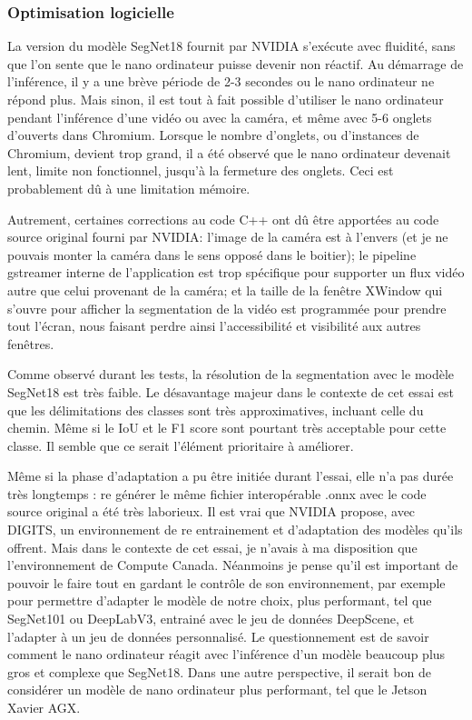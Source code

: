 \subsubsection{Optimisation logicielle}
\par La version du modèle SegNet18 fournit par NVIDIA s'exécute avec fluidité, sans que l'on sente que le nano ordinateur puisse devenir non réactif. Au démarrage de l'inférence, il y a une brève période de 2-3 secondes ou le nano ordinateur ne répond plus. Mais sinon, il est tout à fait possible d'utiliser le nano ordinateur pendant l'inférence d'une vidéo ou avec la caméra, et même avec 5-6 onglets d'ouverts dans Chromium. Lorsque le nombre d'onglets, ou d'instances de Chromium, devient trop grand, il a été observé que le nano ordinateur devenait lent, limite non fonctionnel, jusqu'à la fermeture des onglets. Ceci est probablement dû à une limitation mémoire.
\par Autrement, certaines corrections au code C++ ont dû être apportées au code source original fourni par NVIDIA: l'image de la caméra est à l'envers (et je ne pouvais monter la caméra dans le sens opposé dans le boitier); le pipeline gstreamer interne de l'application est trop spécifique pour supporter un flux vidéo autre que celui provenant de la caméra; et la taille de la fenêtre XWindow qui s'ouvre pour afficher la segmentation de la vidéo est programmée pour prendre tout l'écran, nous faisant perdre ainsi l'accessibilité et visibilité aux autres fenêtres.
\par Comme observé durant les tests, la résolution de la segmentation avec le modèle SegNet18 est très faible. Le désavantage majeur dans le contexte de cet essai est que les délimitations des classes sont très approximatives, incluant celle du chemin. Même si le IoU et le F1 score sont pourtant très acceptable pour cette classe. Il semble que ce serait l'élément prioritaire à améliorer. 
\par Même si la phase d'adaptation a pu être initiée durant l'essai, elle n'a pas durée très longtemps : re générer le même fichier interopérable .onnx avec le code source original a été très laborieux. Il est vrai que NVIDIA propose, avec DIGITS, un environnement de re entrainement et d'adaptation des modèles qu'ils offrent. Mais dans le contexte de cet essai, je n'avais à ma disposition que l'environnement de Compute Canada. Néanmoins je pense qu'il est important de pouvoir le faire tout en gardant le contrôle de son environnement, par exemple pour permettre d'adapter le modèle de notre choix, plus performant, tel que SegNet101 ou DeepLabV3, entrainé avec le jeu de données DeepScene, et l'adapter à un jeu de données personnalisé. Le questionnement est de savoir comment le nano ordinateur réagit avec l'inférence d'un modèle beaucoup plus gros et complexe que SegNet18. Dans une autre perspective, il serait bon de considérer un modèle de nano ordinateur plus performant, tel que le Jetson Xavier AGX.
